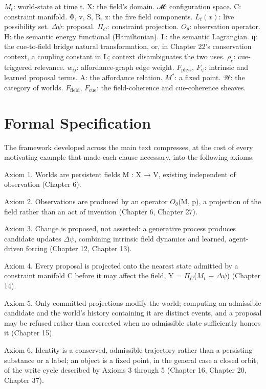 \(M_t\): world-state at time t. X: the field's domain. 𝓜: configuration space. C: constraint manifold. Φ, v, S, R, z: the five field components. \(L_t(x)\): live possibility set. \(\Delta\psi\): proposal. \(\Pi_C\): constraint projection. \(O_\theta\): observation operator. H: the semantic energy functional (Hamiltonian). L: the semantic Lagrangian. η: the cue-to-field bridge natural transformation, or, in Chapter 22's conservation context, a coupling constant in L; context disambiguates the two uses. \(\rho_c\): cue-triggered relevance. \(w_{ij}\): affordance-graph edge weight. \(F_{\mathrm{phys}}\), \(F_\psi\): intrinsic and learned proposal terms. A: the affordance relation. \(M^*\): a fixed point. 𝒲: the category of worlds. \(F_{\mathrm{field}}\), \(F_{\mathrm{cue}}\): the field-coherence and cue-coherence sheaves.

\section{Formal Specification}

The framework developed across the main text compresses, at the cost of every motivating example that made each clause necessary, into the following axioms.

Axiom 1. Worlds are persistent fields M : X → V, existing independent of observation (Chapter 6).

Axiom 2. Observations are produced by an operator \(O_\theta\)(M, p), a projection of the field rather than an act of invention (Chapter 6, Chapter 27).

Axiom 3. Change is proposed, not asserted: a generative process produces candidate updates \(\Delta\psi\), combining intrinsic field dynamics and learned, agent-driven forcing (Chapter 12, Chapter 13).

Axiom 4. Every proposal is projected onto the nearest state admitted by a constraint manifold C before it may affect the field, Y = \(\Pi_C\)(\(M_t\) + \(\Delta\psi\)) (Chapter 14).

Axiom 5. Only committed projections modify the world; computing an admissible candidate and the world's history containing it are distinct events, and a proposal may be refused rather than corrected when no admissible state sufficiently honors it (Chapter 15).

Axiom 6. Identity is a conserved, admissible trajectory rather than a persisting substance or a label; an object is a fixed point, in the general case a closed orbit, of the write cycle described by Axioms 3 through 5 (Chapter 16, Chapter 20, Chapter 37).

